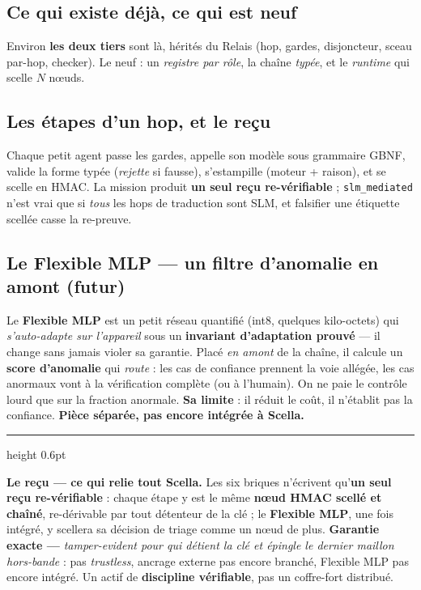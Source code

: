 \documentclass[11pt]{article}
\begin{document}
\subsection{Ce qui existe déjà, ce qui est neuf}
Environ \textbf{les deux tiers} sont là, hérités du Relais (hop, gardes, disjoncteur, sceau
par-hop, checker). Le neuf : un \emph{registre par rôle}, la chaîne \emph{typée}, et le
\emph{runtime} qui scelle $N$ n\oe uds.

\subsection{Les étapes d'un hop, et le reçu}
Chaque petit agent passe les gardes, appelle son modèle sous grammaire GBNF, valide la forme typée
(\emph{rejette} si fausse), s'estampille (moteur + raison), et se scelle en HMAC. La mission produit
\textbf{un seul reçu re-vérifiable} ; \texttt{slm\_mediated} n'est vrai que si \emph{tous} les hops
de traduction sont SLM, et falsifier une étiquette scellée casse la re-preuve.

\subsection{Le Flexible MLP — un filtre d'anomalie en amont (futur)}
Le \textbf{Flexible MLP} est un petit réseau quantifié (int8, quelques kilo-octets) qui
\emph{s'auto-adapte sur l'appareil} sous un \textbf{invariant d'adaptation prouvé} — il change sans
jamais violer sa garantie. Placé \emph{en amont} de la chaîne, il calcule un \textbf{score
d'anomalie} qui \emph{route} : les cas de confiance prennent la voie allégée, les cas anormaux vont
à la vérification complète (ou à l'humain). On ne paie le contrôle lourd que sur la fraction
anormale. \textbf{Sa limite} : il réduit le coût, il n'établit pas la confiance. \textbf{Pièce
séparée, pas encore intégrée à Scella.}

\vspace{3pt}
{\color{boxedge}\hrule height 0.6pt}
\vspace{3pt}
{\color{efenavy}\textbf{Le reçu — ce qui relie tout Scella.}} Les six briques n'écrivent qu'\textbf{un
seul reçu re-vérifiable} : chaque étape y est le même \textbf{n\oe ud HMAC scellé et chaîné},
re-dérivable par tout détenteur de la clé ; le \textbf{Flexible MLP}, une fois intégré, y scellera sa
décision de triage comme un n\oe ud de plus. \textbf{Garantie exacte —} \emph{tamper-evident pour qui
détient la clé et épingle le dernier maillon hors-bande} : pas \emph{trustless}, ancrage externe pas
encore branché, Flexible MLP pas encore intégré. Un actif de \textbf{discipline vérifiable}, pas un
coffre-fort distribué.
\end{document}
